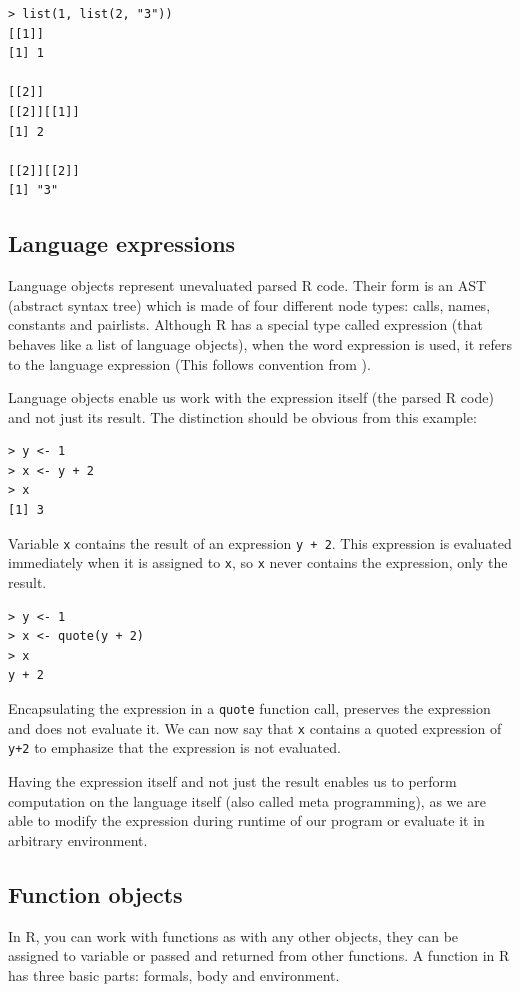 \documentclass[thesis=B,english]{FITthesis}[2012/10/20]
\begin{document}
\begin{verbatim}
> list(1, list(2, "3"))
[[1]]
[1] 1

[[2]]
[[2]][[1]]
[1] 2

[[2]][[2]]
[1] "3"
\end{verbatim}

\subsection{Language expressions}
Language objects represent unevaluated parsed R code. Their form is an AST (abstract syntax tree) which is made of four different node types: calls, names, constants and pairlists. Although R has a special type called expression (that behaves like a list of language objects), when the word expression is used, it refers to the language expression (This follows convention from \cite{advR}).

Language objects enable us work with the expression itself (the parsed R code) and not just its result. The distinction should be obvious from this example:

\begin{verbatim}
> y <- 1
> x <- y + 2
> x
[1] 3
\end{verbatim}

Variable \verb|x| contains the result of an expression \verb|y + 2|. This expression is evaluated immediately when it is assigned to \verb|x|, so \verb|x| never contains the expression, only the result.

\begin{verbatim}
> y <- 1
> x <- quote(y + 2)
> x
y + 2
\end{verbatim}

Encapsulating the expression in a \verb|quote| function call, preserves the expression and does not evaluate it. We can now say that \verb|x| contains a quoted expression of \verb|y+2| to emphasize that the expression is not evaluated. 

Having the expression itself and not just the result enables us to perform computation on the language itself (also called meta programming), as we are able to modify the expression during runtime of our program or evaluate it in arbitrary environment.

\subsection{Function objects}
In R, you can work with functions as with any other objects, they can be assigned to variable or passed and returned from other functions. A function in R has three basic parts: formals, body and environment. 
\end{document}
